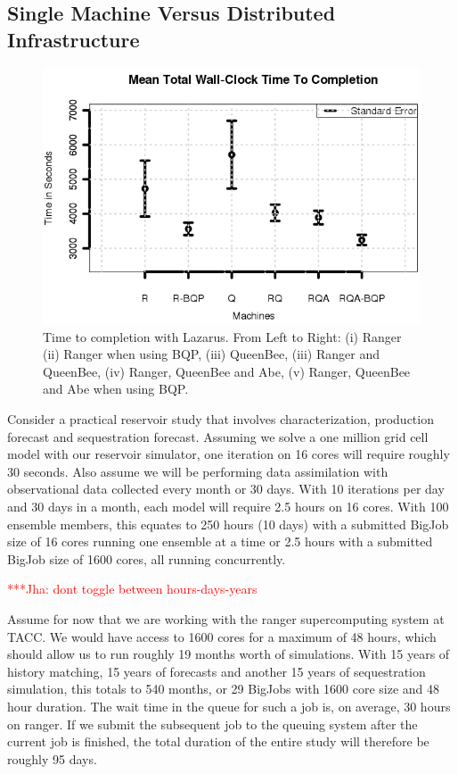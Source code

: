 \documentclass{rspublic}
\newcommand{\jhanote}[1]{ {\textcolor{red} { ***Jha: #1 }}}
\newcommand{\jhanote}[1]{}
\begin{document}
\subsection{Single Machine Versus Distributed Infrastructure}
\begin{figure}
\begin{center}
\includegraphics*[scale=0.5,angle=0]{figures/Figure7.png}
\end{center}
\caption{Time to completion with Lazarus. From Left to Right: (i)
  Ranger (ii) Ranger when using BQP, (iii) QueenBee, (iii) Ranger
  and QueenBee, (iv) Ranger, QueenBee and Abe, (v) Ranger, QueenBee 
  and Abe when using BQP.}
\label{fig:SingleVsDistributed}
\end{figure}

Consider a practical reservoir study that involves characterization,
production forecast and sequestration forecast. Assuming we solve a
one million grid cell model with our reservoir simulator, one
iteration on 16 cores will require roughly 30 seconds. Also assume we
will be performing data assimilation with observational data collected
every month or 30 days. With 10 iterations per day and 30 days in a
month, each model will require 2.5 hours on 16 cores. With 100
ensemble members, this equates to 250 hours (10 days) with a submitted
BigJob size of 16 cores running one ensemble at a time or 2.5 hours
with a submitted BigJob size of 1600 cores, all running concurrently.

\jhanote{dont toggle between hours-days-years}

Assume for now that we are working with the ranger supercomputing
system at TACC. We would have access to 1600 cores for a maximum of 48
hours, which should allow us to run roughly 19 months worth of
simulations. With 15 years of history matching, 15 years of forecasts
and another 15 years of sequestration simulation, this totals to 540
months, or 29 BigJobs with 1600 core size and 48 hour duration. The
wait time in the queue for such a job is, on average, 30 hours on
ranger. If we submit the subsequent job to the queuing system after
the current job is finished, the total duration of the entire study
will therefore be roughly 95 days.
\end{document}
